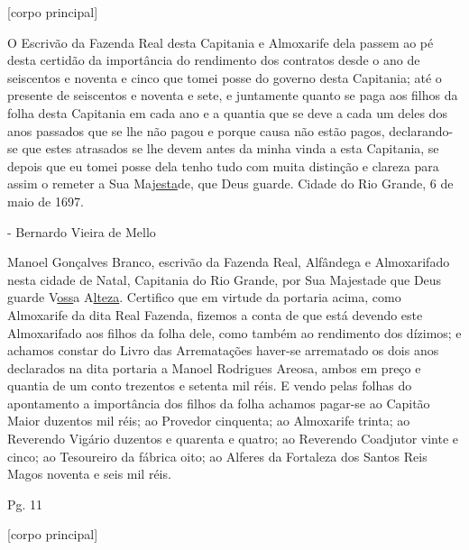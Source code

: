 \begin{refsection}
    \noindent{}[corpo principal] 

    \vspace{1ex}

    O Escrivão da Fazenda Real desta Capitania e Almoxarife dela passem ao pé desta certidão da importância do rendimento dos contratos desde o ano de seiscentos e noventa e cinco que tomei posse do governo desta Capitania; até o presente de seiscentos e noventa e sete, e juntamente quanto se paga aos filhos da folha desta Capitania em cada ano e a quantia que se deve a cada um deles dos anos passados que se lhe não pagou e porque causa não estão pagos, declarando-se que estes atrasados se lhe devem antes da minha vinda a esta Capitania, se depois que eu tomei posse dela tenho tudo com muita distinção e clareza para assim o remeter a Sua Maj\underline{esta}de, que Deus guarde. Cidade do Rio Grande, 6 de maio de 1697. 

    - Bernardo Vieira de Mello  

    Manoel Gonçalves Branco, escrivão da Fazenda Real, Alfândega e Almoxarifado nesta cidade de Natal, Capitania do Rio Grande, por Sua Majestade que Deus guarde V\!\underline{oss}a A\underline{lteza}. Certifico que em virtude da portaria acima, como Almoxarife da dita Real Fazenda, fizemos a conta de que está devendo este Almoxarifado aos filhos da folha dele, como também ao rendimento dos dízimos; e achamos constar do Livro das Arrematações haver-se arrematado os dois anos declarados na dita portaria a Manoel Rodrigues Areosa, ambos em preço e quantia de um conto trezentos e setenta mil réis. E vendo pelas folhas do apontamento a importância dos filhos da folha achamos pagar-se ao Capitão Maior duzentos mil réis; ao Provedor cinquenta; ao Almoxarife trinta; ao Reverendo Vigário duzentos e quarenta e quatro; ao Reverendo Coadjutor vinte e cinco; ao Tesoureiro da fábrica oito; ao Alferes da Fortaleza dos Santos Reis Magos noventa e seis mil réis. 


    \vspace{5mm}

    \noindent{}Pg. 11

    \vspace{1ex}

    \noindent{}[corpo principal] 

    \vspace{1ex}


\end{refsection}

